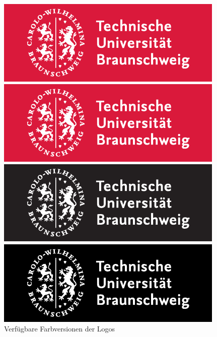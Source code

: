 \begin{figure}[!ht]
\begin{minipage}{0.5\textwidth}
  \centering
  \includegraphics[width=\tubslogoBaseWidth]{TUBraunschweig_4C}
\end{minipage}
\begin{minipage}{0.5\textwidth}
  \centering
  \includegraphics[width=\tubslogoBaseWidth]{TUBraunschweig_SC}
\end{minipage}

\begin{minipage}{0.5\textwidth}
  \centering
  \includegraphics[width=\tubslogoBaseWidth]{TUBraunschweig_B}
\end{minipage}
\begin{minipage}{0.5\textwidth}
  \centering
  \includegraphics[width=\tubslogoBaseWidth]{TUBraunschweig_B_true}
\end{minipage}
\caption{Verfügbare Farbversionen der Logos}
\end{figure}

